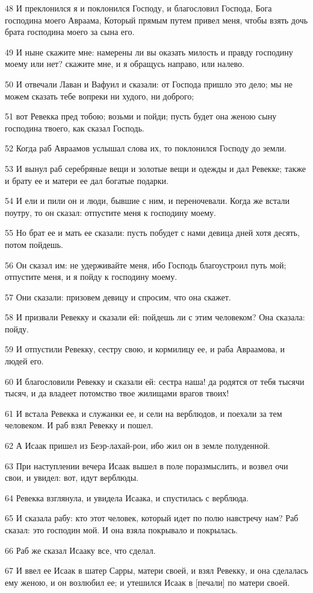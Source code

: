 \par 48 И преклонился я и поклонился Господу, и благословил Господа, Бога господина моего Авраама, Который прямым путем привел меня, чтобы взять дочь брата господина моего за сына его.
\par 49 И ныне скажите мне: намерены ли вы оказать милость и правду господину моему или нет? скажите мне, и я обращусь направо, или налево.
\par 50 И отвечали Лаван и Вафуил и сказали: от Господа пришло это дело; мы не можем сказать тебе вопреки ни худого, ни доброго;
\par 51 вот Ревекка пред тобою; возьми и пойди; пусть будет она женою сыну господина твоего, как сказал Господь.
\par 52 Когда раб Авраамов услышал слова их, то поклонился Господу до земли.
\par 53 И вынул раб серебряные вещи и золотые вещи и одежды и дал Ревекке; также и брату ее и матери ее дал богатые подарки.
\par 54 И ели и пили он и люди, бывшие с ним, и переночевали. Когда же встали поутру, то он сказал: отпустите меня к господину моему.
\par 55 Но брат ее и мать ее сказали: пусть побудет с нами девица дней хотя десять, потом пойдешь.
\par 56 Он сказал им: не удерживайте меня, ибо Господь благоустроил путь мой; отпустите меня, и я пойду к господину моему.
\par 57 Они сказали: призовем девицу и спросим, что она скажет.
\par 58 И призвали Ревекку и сказали ей: пойдешь ли с этим человеком? Она сказала: пойду.
\par 59 И отпустили Ревекку, сестру свою, и кормилицу ее, и раба Авраамова, и людей его.
\par 60 И благословили Ревекку и сказали ей: сестра наша! да родятся от тебя тысячи тысяч, и да владеет потомство твое жилищами врагов твоих!
\par 61 И встала Ревекка и служанки ее, и сели на верблюдов, и поехали за тем человеком. И раб взял Ревекку и пошел.
\par 62 А Исаак пришел из Беэр-лахай-рои, ибо жил он в земле полуденной.
\par 63 При наступлении вечера Исаак вышел в поле поразмыслить, и возвел очи свои, и увидел: вот, идут верблюды.
\par 64 Ревекка взглянула, и увидела Исаака, и спустилась с верблюда.
\par 65 И сказала рабу: кто этот человек, который идет по полю навстречу нам? Раб сказал: это господин мой. И она взяла покрывало и покрылась.
\par 66 Раб же сказал Исааку все, что сделал.
\par 67 И ввел ее Исаак в шатер Сарры, матери своей, и взял Ревекку, и она сделалась ему женою, и он возлюбил ее; и утешился Исаак в [печали] по матери своей.

